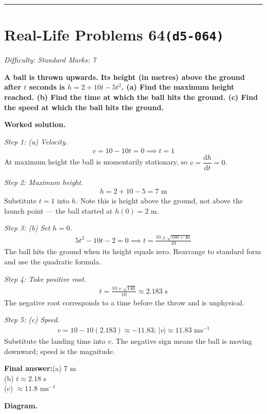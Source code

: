 \documentclass[11pt]{article}
\newcommand{\question}[1]{\par\medskip\noindent\textbf{#1}\par}
\begin{document}
\medskip\hrule

\section*{Real-Life Problems 64\quad\small\texttt{(d5-064)}}
\textit{Difficulty: Standard \quad\textbar\quad Marks: 7}

\question{A ball is thrown upwards. Its height (in metres) above the ground after \( t \) seconds is \( h = 2 + 10t - 5t^2 \). (a) Find the maximum height reached. (b) Find the time at which the ball hits the ground. (c) Find the speed at which the ball hits the ground.}

\textbf{Worked solution.}

\textit{Step 1: (a) Velocity.}
\[\begin{gathered}
v = 10 - 10t = 0 \implies t = 1
\end{gathered}\]
At maximum height the ball is momentarily stationary, so \( v = \dfrac{\mathrm{d}h}{\mathrm{d}t} = 0 \).

\textit{Step 2: Maximum height.}
\[\begin{gathered}
h = 2 + 10 - 5 = 7 \text{ m}
\end{gathered}\]
Substitute \( t = 1 \) into \( h \). Note this is height above the ground, not above the launch point --- the ball started at \( h(0) = 2 \) m.

\textit{Step 3: (b) Set \( h = 0 \).}
\[\begin{gathered}
5t^2 - 10t - 2 = 0 \implies t = \frac{10 \pm \sqrt{100 + 40}}{10}
\end{gathered}\]
The ball hits the ground when its height equals zero. Rearrange to standard form and use the quadratic formula.

\textit{Step 4: Take positive root.}
\[\begin{gathered}
t = \frac{10 + \sqrt{140}}{10} \approx 2.183 \text{ s}
\end{gathered}\]
The negative root corresponds to a time before the throw and is unphysical.

\textit{Step 5: (c) Speed.}
\[\begin{gathered}
v = 10 - 10(2.183) \approx -11.83; \, |v| \approx 11.83 \text{ ms}^{-1}
\end{gathered}\]
Substitute the landing time into \( v \). The negative sign means the ball is moving downward; speed is the magnitude.

\begin{answerbox}
\textbf{Final answer:}\quad (a) \(\displaystyle  7 \) m \\[3pt]  (b) \(\displaystyle  t \approx 2.18 \) s \\[3pt]  (c) \(\displaystyle  \approx 11.8 \text{ ms}^{-1} \)
\end{answerbox}
\textbf{Diagram.}
\end{document}
